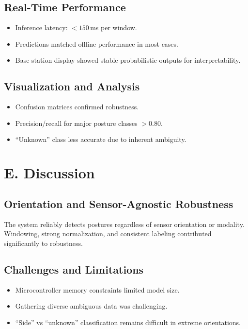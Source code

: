\documentclass[12pt]{article}
\begin{document}
\subsection*{Real-Time Performance}
\begin{itemize}
    \item Inference latency: $<150$\,ms per window.
    \item Predictions matched offline performance in most cases.
    \item Base station display showed stable probabilistic outputs for interpretability.
\end{itemize}

\subsection*{Visualization and Analysis}
\begin{itemize}
    \item Confusion matrices confirmed robustness.
    \item Precision/recall for major posture classes $>0.80$.
    \item ``Unknown'' class less accurate due to inherent ambiguity.
\end{itemize}

\section*{E. Discussion}

\subsection*{Orientation and Sensor-Agnostic Robustness}
The system reliably detects postures regardless of sensor orientation or modality. Windowing, strong normalization, and consistent labeling contributed significantly to robustness.

\subsection*{Challenges and Limitations}
\begin{itemize}
    \item Microcontroller memory constraints limited model size.
    \item Gathering diverse ambiguous data was challenging.
    \item ``Side'' vs ``unknown'' classification remains difficult in extreme orientations.
\end{itemize}
\end{document}
